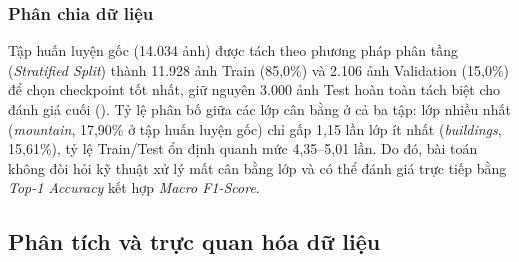 \subsubsection{Phân chia dữ liệu}
Tập huấn luyện gốc (14.034 ảnh) được tách theo phương pháp phân tầng (\textit{Stratified Split}) thành 11.928 ảnh Train (85,0\%) và 2.106 ảnh Validation (15,0\%) để chọn checkpoint tốt nhất, giữ nguyên 3.000 ảnh Test hoàn toàn tách biệt cho đánh giá cuối (). Tỷ lệ phân bố giữa các lớp cân bằng ở cả ba tập: lớp nhiều nhất (\textit{mountain}, 17,90\% ở tập huấn luyện gốc) chỉ gấp 1,15 lần lớp ít nhất (\textit{buildings}, 15,61\%), tỷ lệ Train/Test ổn định quanh mức 4,35--5,01 lần. Do đó, bài toán không đòi hỏi kỹ thuật xử lý mất cân bằng lớp và có thể đánh giá trực tiếp bằng \textit{Top-1 Accuracy} kết hợp \textit{Macro F1-Score}.

\begin{table}[H]
  \centering
  \caption{Cấu trúc phân chia dữ liệu phân tầng theo 6 lớp trên tập \textit{Intel Image Classification} (17.034 ảnh).}
  \label{tab:img_split}
\end{table}

\subsection{Phân tích và trực quan hóa dữ liệu}
\label{subsec:img_eda}

